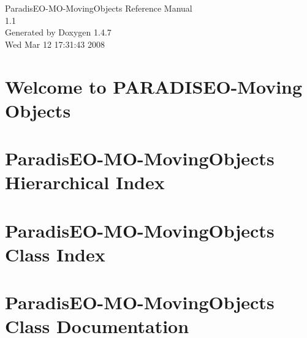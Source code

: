 \documentclass[a4paper]{book}
\begin{document}
\begin{titlepage}
\vspace*{7cm}
\begin{center}
{\Large Paradis\-EO-MO-Moving\-Objects Reference Manual\\[1ex]\large 1.1 }\\
\vspace*{1cm}
{\large Generated by Doxygen 1.4.7}\\
\vspace*{0.5cm}
{\small Wed Mar 12 17:31:43 2008}\\
\end{center}
\end{titlepage}
\clearemptydoublepage
{}
\tableofcontents
\clearemptydoublepage
{}
\chapter{Welcome to PARADISEO-Moving Objects }
\label{index}
\chapter{Paradis\-EO-MO-Moving\-Objects Hierarchical Index}

\chapter{Paradis\-EO-MO-Moving\-Objects Class Index}

\chapter{Paradis\-EO-MO-Moving\-Objects Class Documentation}




































\printindex
\end{document}
